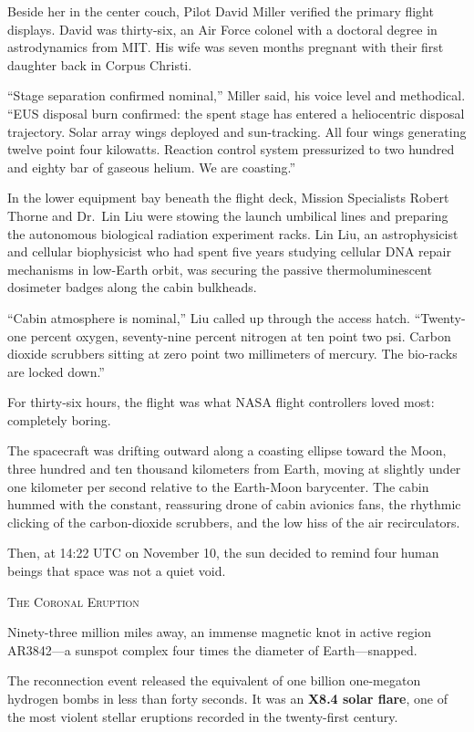 \documentclass[12pt,twoside,openright]{book}
\newcommand{\sceneheader}[1]{%
  \par\vspace{1.8em}%
  {\noindent\centering\scshape\large #1\par}%
  \vspace{1.0em}%
  \noindent%
}
\newcommand{\dinkus}{%
  \par\vspace{1.2em}%
  {\noindent\centering{\large $\ast\quad\ast\quad\ast$}\par}%
  \vspace{1.2em}%
  \noindent%
}
\begin{document}
Beside her in the center couch, Pilot David Miller verified the primary
flight displays. David was thirty-six, an Air Force colonel with a
doctoral degree in astrodynamics from MIT. His wife was seven months
pregnant with their first daughter back in Corpus Christi.

``Stage separation confirmed nominal,'' Miller said, his voice level and
methodical. ``EUS disposal burn confirmed: the spent stage has entered a
heliocentric disposal trajectory. Solar array wings deployed and
sun-tracking. All four wings generating twelve point four kilowatts.
Reaction control system pressurized to two hundred and eighty bar of
gaseous helium. We are coasting.''

In the lower equipment bay beneath the flight deck, Mission Specialists
Robert Thorne and Dr.~Lin Liu were stowing the launch umbilical lines
and preparing the autonomous biological radiation experiment racks. Lin
Liu, an astrophysicist and cellular biophysicist who had spent five
years studying cellular DNA repair mechanisms in low-Earth orbit, was
securing the passive thermoluminescent dosimeter badges along the cabin
bulkheads.

``Cabin atmosphere is nominal,'' Liu called up through the access hatch.
``Twenty-one percent oxygen, seventy-nine percent nitrogen at ten point
two psi. Carbon dioxide scrubbers sitting at zero point two millimeters
of mercury. The bio-racks are locked down.''

For thirty-six hours, the flight was what NASA flight controllers loved
most: completely boring.

The spacecraft was drifting outward along a coasting ellipse toward the
Moon, three hundred and ten thousand kilometers from Earth, moving at
slightly under one kilometer per second relative to the Earth-Moon
barycenter. The cabin hummed with the constant, reassuring drone of
cabin avionics fans, the rhythmic clicking of the carbon-dioxide
scrubbers, and the low hiss of the air recirculators.

Then, at 14:22 UTC on November 10, the sun decided to remind four human
beings that space was not a quiet void.

\dinkus

\sceneheader{The Coronal Eruption}

Ninety-three million miles away, an immense magnetic knot in active
region AR3842---a sunspot complex four times the diameter of
Earth---snapped.

The reconnection event released the equivalent of one billion
one-megaton hydrogen bombs in less than forty seconds. It was an
\textbf{X8.4 solar flare}, one of the most violent stellar eruptions
recorded in the twenty-first century.
\end{document}
